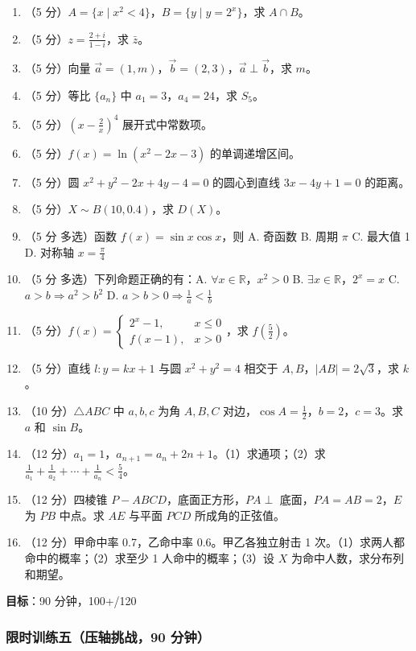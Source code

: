 \begin{enumerate}
  \item（5 分）$A=\{x\mid x^2<4\}$，$B=\{y\mid y=2^x\}$，求 $A\cap B$。
  \item（5 分）$z=\frac{2+i}{1-i}$，求 $\bar{z}$。
  \item（5 分）向量 $\vec{a}=(1,m)$，$\vec{b}=(2,3)$，$\vec{a}\perp\vec{b}$，求 $m$。
  \item（5 分）等比 $\{a_n\}$ 中 $a_1=3$，$a_4=24$，求 $S_5$。
  \item（5 分）$(x-\frac{2}{x})^4$ 展开式中常数项。
  \item（5 分）$f(x)=\ln(x^2-2x-3)$ 的单调递增区间。
  \item（5 分）圆 $x^2+y^2-2x+4y-4=0$ 的圆心到直线 $3x-4y+1=0$ 的距离。
  \item（5 分）$X\sim B(10,0.4)$，求 $D(X)$。
  \item（5 分 多选）函数 $f(x)=\sin x\cos x$，则 A. 奇函数 B. 周期 $\pi$ C. 最大值 1 D. 对称轴 $x=\frac{\pi}{4}$
  \item（5 分 多选）下列命题正确的有：A. $\forall x\in\mathbb{R}$，$x^2>0$ B. $\exists x\in\mathbb{R}$，$2^x=x$ C. $a>b\Rightarrow a^2>b^2$ D. $a>b>0\Rightarrow \frac1a<\frac1b$
  \item（5 分）$f(x)=\begin{cases} 2^x-1, & x\le0 \\ f(x-1), & x>0 \end{cases}$，求 $f(\frac52)$。
  \item（5 分）直线 $l:y=kx+1$ 与圆 $x^2+y^2=4$ 相交于 $A,B$，$|AB|=2\sqrt3$，求 $k$。
  \item（10 分）$\triangle ABC$ 中 $a,b,c$ 为角 $A,B,C$ 对边，$\cos A=\frac12$，$b=2$，$c=3$。求 $a$ 和 $\sin B$。
  \item（12 分）$a_1=1$，$a_{n+1}=a_n+2n+1$。（1）求通项；（2）求 $\frac1{a_1}+\frac1{a_2}+\cdots+\frac1{a_n}< \frac54$。
  \item（12 分）四棱锥 $P-ABCD$，底面正方形，$PA\perp$ 底面，$PA=AB=2$，$E$ 为 $PB$ 中点。求 $AE$ 与平面 $PCD$ 所成角的正弦值。
  \item（12 分）甲命中率 0.7，乙命中率 0.6。甲乙各独立射击 1 次。（1）求两人都命中的概率；（2）求至少 1 人命中的概率；（3）设 $X$ 为命中人数，求分布列和期望。
\end{enumerate}

\textbf{目标}：90 分钟，100+/120

\subsubsection{限时训练五（压轴挑战，90 分钟）}


